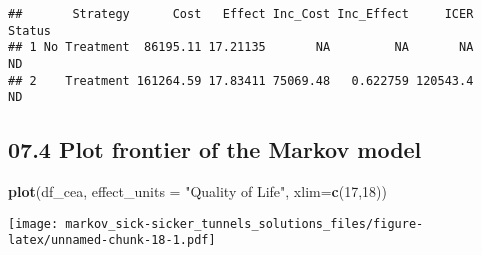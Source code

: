 \documentclass[
]{article}
\newenvironment{Shaded}{\begin{snugshade}}{\end{snugshade}}
\newcommand{\DataTypeTok}[1]{\textcolor[rgb]{0.13,0.29,0.53}{#1}}
\newcommand{\DecValTok}[1]{\textcolor[rgb]{0.00,0.00,0.81}{#1}}
\newcommand{\KeywordTok}[1]{\textcolor[rgb]{0.13,0.29,0.53}{\textbf{#1}}}
\newcommand{\NormalTok}[1]{#1}
\newcommand{\StringTok}[1]{\textcolor[rgb]{0.31,0.60,0.02}{#1}}
\begin{document}
\begin{verbatim}
##       Strategy      Cost   Effect Inc_Cost Inc_Effect     ICER Status
## 1 No Treatment  86195.11 17.21135       NA         NA       NA     ND
## 2    Treatment 161264.59 17.83411 75069.48   0.622759 120543.4     ND
\end{verbatim}

\hypertarget{plot-frontier-of-the-markov-model}{%
\subsection{07.4 Plot frontier of the Markov
model}\label{plot-frontier-of-the-markov-model}}

\begin{Shaded}
\begin{Highlighting}[]
\KeywordTok{plot}\NormalTok{(df_cea, }\DataTypeTok{effect_units =} \StringTok{"Quality of Life"}\NormalTok{, }\DataTypeTok{xlim=}\KeywordTok{c}\NormalTok{(}\DecValTok{17}\NormalTok{,}\DecValTok{18}\NormalTok{))}
\end{Highlighting}
\end{Shaded}

\texttt{[image: markov\_sick-sicker\_tunnels\_solutions\_files/figure-latex/unnamed-chunk-18-1.pdf]}
\end{document}
